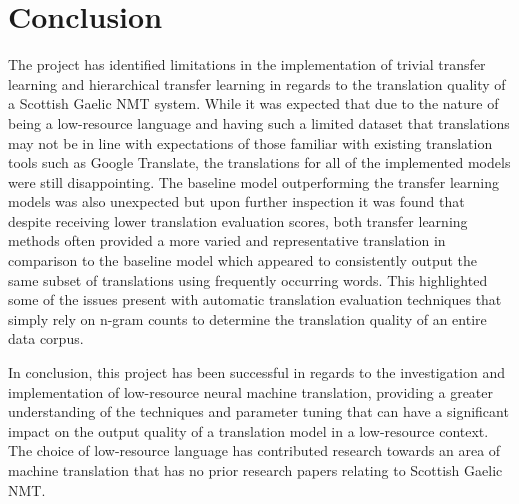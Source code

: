 

\section{Conclusion}

The project has identified limitations in the implementation of trivial transfer learning and hierarchical transfer learning in regards to the translation quality of a Scottish Gaelic \acrshort{NMT} system. While it was expected that due to the nature of being a low-resource language and having such a limited dataset that translations may not be in line with expectations of those familiar with existing translation tools such as Google Translate, the translations for all of the implemented models were still disappointing. The baseline model outperforming the transfer learning models was also unexpected but upon further inspection it was found that despite receiving lower translation evaluation scores, both transfer learning methods often provided a more varied and representative translation in comparison to the baseline model which appeared to consistently output the same subset of translations using frequently occurring words. This highlighted some of the issues present with automatic translation evaluation techniques that simply rely on n-gram counts to determine the translation quality of an entire data corpus.

In conclusion, this project has been successful in regards to the investigation and implementation of low-resource neural machine translation, providing a greater understanding of the techniques and parameter tuning that can have a significant impact on the output quality of a translation model in a low-resource context. The choice of low-resource language has contributed research towards an area of machine translation that has no prior research papers relating to Scottish Gaelic \acrshort{NMT}.